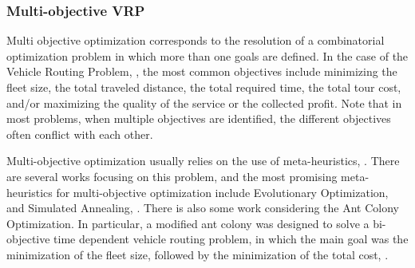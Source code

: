 \subsubsection{Multi-objective VRP}
\label{sec:multi-objetive-vrp}

Multi objective optimization corresponds to the resolution of a combinatorial optimization problem in which more than one goals are defined. In the case of the Vehicle Routing Problem, \cite{multi_objective_vrp}, the most common objectives include minimizing the fleet size, the total traveled distance, the total required time, the total tour cost, and/or maximizing the quality of the service or the collected profit. Note that in most problems, when multiple objectives are identified, the different objectives often conflict with each other.

Multi-objective optimization usually relies on the use of meta-heuristics, \cite{multi-objective-meta}. There are several works focusing on this problem, and the most promising meta-heuristics  for multi-objective optimization include Evolutionary Optimization, \cite{eo_multi_objective} and Simulated Annealing, \cite{sa_multi_objective}. There is also some work considering the Ant Colony Optimization. In particular, a modified ant colony was designed to solve a bi-objective time dependent vehicle routing problem, in which the main goal was the minimization of the fleet size, followed by the minimization of the total cost, \cite{TDVRP_multi_objective_aco}.



